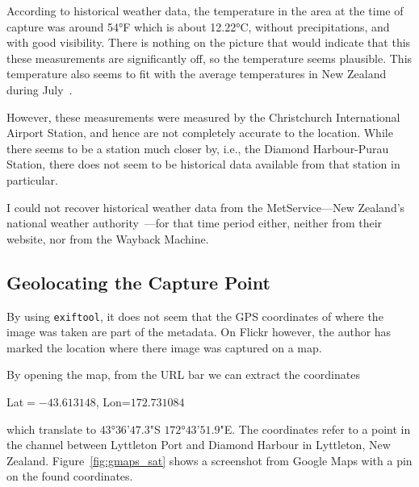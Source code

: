 \documentclass[parskip=half]{scrartcl}
\newcommand\figref{Figure~\ref}
\begin{document}
According to historical weather data\footnotemark, the temperature in the area
at the time of capture was around 54°F which is about 12.22°C, without
precipitations, and with good visibility. There is nothing on the picture that
would indicate that this these measurements are significantly off, so the
temperature seems plausible. This temperature also seems to fit with the
average temperatures in New Zealand during July~\cite{temperature}.


However, these measurements were measured by the Christchurch International
Airport Station, and hence are not completely accurate to the location. While
there seems to be a station much closer by, i.e., the  Diamond Harbour-Purau
Station\footnotemark, there does not seem to be historical data available from
that station in particular.


I could not recover historical weather data from the MetService---New Zealand's
national weather authority~\cite{metservice}---for that time period
either, neither from their website, nor from the Wayback Machine\footnotemark.


\subsection{Geolocating the Capture Point}

By using \texttt{exiftool}, it does not seem that the GPS coordinates of where
the image was taken are part of the metadata. On Flickr however, the author has
marked the location where there image was captured on a map.

By opening the map, from the URL bar we can extract the coordinates
\begin{center}
    Lat$=-43.613148$, Lon=$172.731084$
\end{center}
which translate to $43$°$36$'$47.3$"S $172$°$43$'$51.9$"E. The coordinates refer
to a point in the channel between Lyttleton Port and Diamond Harbour in
Lyttleton, New Zealand. \figref{fig:gmaps_sat} shows a screenshot from Google
Maps with a pin on the found coordinates.
\end{document}
